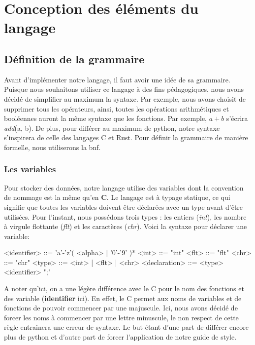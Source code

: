 \documentclass[a4paper]{article}%
\begin{document}
\section{Conception des éléments du langage}

\subsection{Définition de la grammaire}

Avant d'implémenter notre langage, il faut avoir une idée de sa grammaire.
Puisque nous souhaitons utiliser ce langage à des fins pédagogiques, nous avons
décidé de simplifier au maximum la syntaxe. Par exemple, nous avons choisit de
supprimer tous les opérateurs, ainsi, toutes les opérations arithmétiques et
booléennes auront la même syntaxe que les fonctions. Par exemple, $a+b$ s'écrira
\textit{add}(a, b). De plus, pour différer au maximum de python, notre syntaxe
s'inspirera de celle des langages C et Rust. Pour définir la grammaire de
manière formelle, nous utiliserons la \gls{bnf}.

\subsubsection*{Les variables}

Pour stocker des données, notre langage utilise des variables dont la
convention de nommage est la même qu'en \textbf{C}. Le langage est à typage
statique, ce qui signifie que toutes les variables doivent être déclarées avec
un type avant d'être utilisées. Pour l'instant, nous possédons trois types :
les entiers (\textit{int}), les nombre à virgule flottante (\textit{flt}) et les
caractères (\textit{chr}). Voici la syntaxe pour déclarer une variable:

\begin{grammar}
<identifier> ::= 'a'-'z'( <alpha> | '0'-'9' )*
<int> ::= "int"
<flt> ::= "flt"
<chr> ::= "chr"
<type> ::= <int> | <flt> | <chr>
<declaration> ::= <type> <identifier> ";"
\end{grammar}\leavevmode\newline

A noter qu'ici, on a une légère différence avec le C pour le nom des fonctions
et des variable (\textbf{identifier} ici). En effet, le C permet aux noms de
variables et de fonctions de pouvoir commencer par une majuscule. Ici, nous
avons décidé de forcer les noms à commencer par une lettre minuscule, le non
respect de cette règle entrainera une erreur de syntaxe. Le but étant d'une part
de différer encore plus de python et d'autre part de forcer l'application de
notre guide de style.
\end{document}
